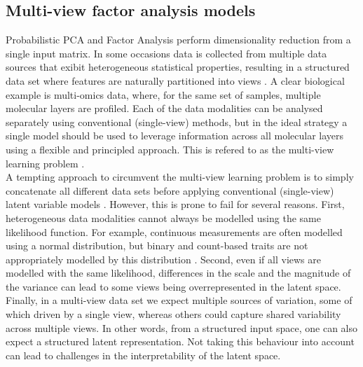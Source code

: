 


\subsection{Multi-view factor analysis models}

Probabilistic PCA and Factor Analysis perform dimensionality reduction from a single input matrix. In some occasions data is collected from multiple data sources that exibit heterogeneous statistical properties, resulting in a structured data set where features are naturally partitioned into views \cite{Xu2013,Li2016,Zeng2018}. A clear biological example is multi-omics data, where, for the same set of samples, multiple molecular layers are profiled. Each of the data modalities can be analysed separately using conventional (single-view) methods, but in the ideal strategy a single model should be used to leverage information across all molecular layers using a flexible and principled approach. This is refered to as the multi-view learning problem \cite{Xu2013,Li2016}.\\
A tempting approach to circumvent the multi-view learning problem is to simply concatenate all different data sets before applying conventional (single-view) latent variable models \cite{Ritchie2015}. However, this is prone to fail for several reasons. First, heterogeneous data modalities cannot always be modelled using the same likelihood function. For example, continuous measurements are often modelled using a normal distribution, but binary and count-based traits are not appropriately modelled by this distribution \cite{Pilling2018}. Second, even if all views are modelled with the same likelihood, differences in the scale and the magnitude of the variance can lead to some views being overrepresented in the latent space. Finally, in a multi-view data set we expect multiple sources of variation, some of which driven by a single view, whereas others could capture shared variability across multiple views. In other words, from a structured input space, one can also expect a structured latent representation. Not taking this behaviour into account can lead to challenges in the interpretability of the latent space.

